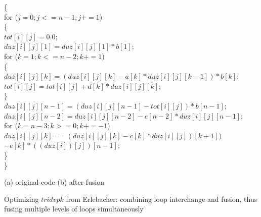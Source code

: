 \begin {figure*}
{\begin {minipage}{.4\textwidth}
\begin {tabbing}
\>  \{ \\
\>\>  for ($j = 0; j <= n-1; j += 1$)\\
\>\>  \{ \\
\>\>\>     $tot[i][j] = 0.0$;\\
\>\>\>     $duz[i][j][1] = duz[i][j][1] * b[1]$;\\
\>\>\>  for ($k = 1; k <= n-2; k += 1$)\\
\>\>\> \{ \\
\>\>\>\>   $duz[i][j][k] = (duz[i][j][k] - a[k] * duz[i][j][k - 1]) * b[k]$;\\
\>\>\>\>   $tot[i][j] = tot[i][j] + d[k] * duz[i][j][k]$;\\
\>\>\>  \} \\
\>\>\>     $duz[i][j][n-1] = (duz[i][j][n-1] - tot[i][j]) * b[n-1]$;\\
\>\>\>     $duz[i][j][n-2] = duz[i][j][n-2] - e[n-2] * duz[i][j][n-1]$;\\
\>\>\>  for ($k = n-3; k >= 0; k += -1$)\\
\>\>\>\>    $duz[i][j][k] = $ \= $(duz[i][j][k] - c[k] * duz[i][j])[k + 1])$ \\
\>\>\>\>\>  $- e[k] * ((duz[i])[j])[n-1]$;\\
\>\> \} \\
\> \} 
\end {tabbing}
\end {minipage}
\begin {minipage}{\textwidth}
\vspace{.2in}
\hspace{.08\textwidth} (a) original code \hspace{.5\textwidth}
(b) after fusion
\end {minipage}
}
\endfig
\caption {Optimizing $tridvpk$ from Erlebacher: 
combining loop interchange and fusion, thus
fusing multiple levels of loops simultaneously} 
\label {fig-tridvpk}
\end {figure*}

